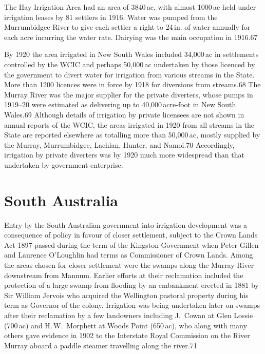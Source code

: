The Hay Irrigation Area had an area of 3840\,ac, with almost 1000\,ac
held under irrigation leases by 81 settlers in 1916. Water was pumped
from the Murrumbidgee River to give each settler a right to 24\,in. of
water annually for each acre incurring the water rate.  Dairying was
the main occupation in 1916.67

By 1920 the area irrigated in New South Wales included 34,000\,ac in
settlements controlled by the WCIC and perhaps 50,000\,ac undertaken
by those licenced by the government to divert water for irrigation
from various streams in the State.  More than 1200 licences were in
force by 1918 for diversions from streams.68 The Murray River was the
major supplier for the private diverters, whose pumps in 1919--20 were
estimated as delivering up to 40,000\,acre-foot in New South Wales.69
Although details of irrigation by private licensees are not shown in
annual reports of the WCIC, the areas irrigated in 1920 from all
streams in the State are reported elsewhere as totalling more than
50,000\,ac, mostly supplied by the Murray, Murrumbidgee, Lachlan,
Hunter, and Namoi.70 Accordingly, irrigation by private diverters was
by 1920 much more widespread than that undertaken by government
enterprise.

\section{South Australia}

Entry by the South Australian government into irrigation development
was a consequence of policy in favour of closer settlement, subject to
the Crown Lands Act 1897 passed during the term of the Kingston
Government when Peter Gillen and Laurence O'Loughlin had terms as
Commissioner of Crown Lands.  Among the areas chosen for closer
settlement were the swamps along the Murray River downstream from
Mannum.  Earlier efforts at their reclamation included the protection
of a large swamp from flooding by an embankment erected in 1881 by Sir
William Jervois who acquired the Wellington pastoral property during
his term as Governor of the colony.  Irrigation was being undertaken
later on swamps after their reclamation by a few landowners including
J.~Cowan at Glen Lossie (700\,ac) and H.\,W.~Morphett at Woods Point
(650\,ac), who along with many others gave evidence in 1902 to the
Interstate Royal Commission on the River Murray aboard a paddle
steamer travelling along the river.71

